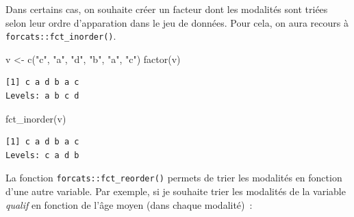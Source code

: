 \documentclass[
  letterpaper,
  DIV=11,
  numbers=noendperiod,
  oneside]{scrreprt}
\newenvironment{Shaded}{\begin{snugshade}}{\end{snugshade}}
\newcommand{\AttributeTok}[1]{\textcolor[rgb]{0.40,0.45,0.13}{#1}}
\newcommand{\FunctionTok}[1]{\textcolor[rgb]{0.28,0.35,0.67}{#1}}
\newcommand{\NormalTok}[1]{\textcolor[rgb]{0.00,0.23,0.31}{#1}}
\newcommand{\OtherTok}[1]{\textcolor[rgb]{0.00,0.23,0.31}{#1}}
\newcommand{\SpecialCharTok}[1]{\textcolor[rgb]{0.37,0.37,0.37}{#1}}
\newcommand{\StringTok}[1]{\textcolor[rgb]{0.13,0.47,0.30}{#1}}
\begin{document}
Dans certains cas, on souhaite créer un facteur dont les modalités sont
triées selon leur ordre d'apparation dans le jeu de données. Pour cela,
on aura recours à \texttt{forcats::fct\_inorder()}.

\begin{Shaded}
\begin{Highlighting}[]
\NormalTok{v }\OtherTok{\textless{}{-}} \FunctionTok{c}\NormalTok{(}\StringTok{"c"}\NormalTok{, }\StringTok{"a"}\NormalTok{, }\StringTok{"d"}\NormalTok{, }\StringTok{"b"}\NormalTok{, }\StringTok{"a"}\NormalTok{, }\StringTok{"c"}\NormalTok{)}
\FunctionTok{factor}\NormalTok{(v)}
\end{Highlighting}
\end{Shaded}

\begin{verbatim}
[1] c a d b a c
Levels: a b c d
\end{verbatim}

\begin{Shaded}
\begin{Highlighting}[]
\FunctionTok{fct\_inorder}\NormalTok{(v)}
\end{Highlighting}
\end{Shaded}

\begin{verbatim}
[1] c a d b a c
Levels: c a d b
\end{verbatim}

La fonction \texttt{forcats::fct\_reorder()} permets de trier les
modalités en fonction d'une autre variable. Par exemple, si je souhaite
trier les modalités de la variable \emph{qualif} en fonction de l'âge
moyen (dans chaque modalité)~:

\begin{Shaded}
\end{Shaded}
\end{document}
